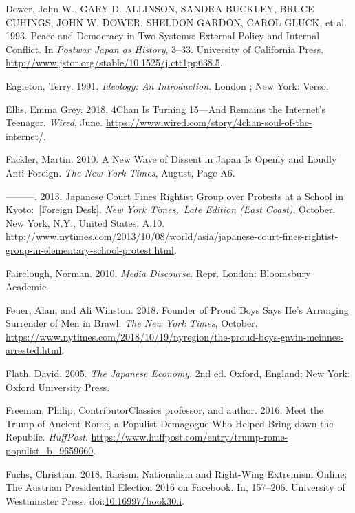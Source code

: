 \documentclass[10pt,british,A4paper,,openany]{memoir}
\begin{document}
\hypertarget{ref-dower_peace_1993}{}
Dower, John W., GARY D. ALLINSON, SANDRA BUCKLEY, BRUCE CUHINGS, JOHN W.
DOWER, SHELDON GARDON, CAROL GLUCK, et al. 1993. Peace and Democracy in
Two Systems: External Policy and Internal Conflict. In \emph{Postwar
Japan as History}, 3--33. University of California Press.
\url{http://www.jstor.org/stable/10.1525/j.ctt1pp638.5}.

\hypertarget{ref-eagleton_ideology:_1991}{}
Eagleton, Terry. 1991. \emph{Ideology: An Introduction}. London ; New
York: Verso.

\hypertarget{ref-ellis_4chan_2018}{}
Ellis, Emma Grey. 2018. 4Chan Is Turning 15---And Remains the Internet's
Teenager. \emph{Wired}, June.
\url{https://www.wired.com/story/4chan-soul-of-the-internet/}.

\hypertarget{ref-fackler_new_2010-1}{}
Fackler, Martin. 2010. A New Wave of Dissent in Japan Is Openly and
Loudly Anti-Foreign. \emph{The New York Times}, August, Page A6.

\hypertarget{ref-fackler_japanese_2013}{}
---------. 2013. Japanese Court Fines Rightist Group over Protests at a
School in Kyoto:~{[}Foreign Desk{]}. \emph{New York Times,~Late Edition
(East Coast)}, October. New York, N.Y., United States, A.10.
\url{http://www.nytimes.com/2013/10/08/world/asia/japanese-court-fines-rightist-group-in-elementary-school-protest.html}.

\hypertarget{ref-fairclough_media_2010}{}
Fairclough, Norman. 2010. \emph{Media Discourse}. Repr. London:
Bloomsbury Academic.

\hypertarget{ref-feuer_founder_2018}{}
Feuer, Alan, and Ali Winston. 2018. Founder of Proud Boys Says He's
Arranging Surrender of Men in Brawl. \emph{The New York Times}, October.
\url{https://www.nytimes.com/2018/10/19/nyregion/the-proud-boys-gavin-mcinnes-arrested.html}.

\hypertarget{ref-flath_japanese_2005}{}
Flath, David. 2005. \emph{The Japanese Economy}. 2nd ed. Oxford,
England; New York: Oxford University Press.

\hypertarget{ref-freeman_meet_2016}{}
Freeman, Philip, ContributorClassics professor, and author. 2016. Meet
the Trump of Ancient Rome, a Populist Demagogue Who Helped Bring down
the Republic. \emph{HuffPost}.
\url{https://www.huffpost.com/entry/trump-rome-populist_b_9659660}.

\hypertarget{ref-fuchs_racism_2018}{}
Fuchs, Christian. 2018. Racism, Nationalism and Right-Wing Extremism
Online: The Austrian Presidential Election 2016 on Facebook. In,
157--206. University of Westminster Press.
doi:\href{https://doi.org/10.16997/book30.i}{10.16997/book30.i}.
\end{document}
